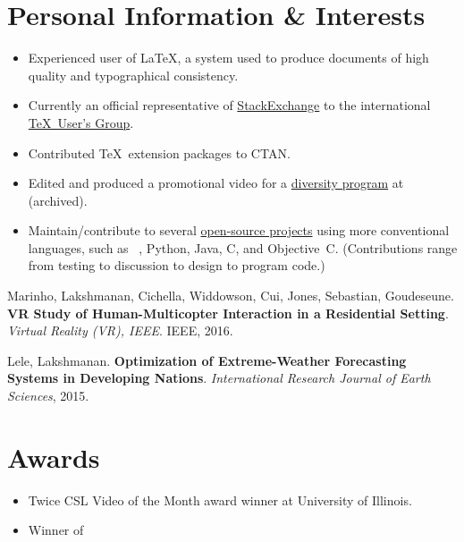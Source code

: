 \documentclass{simplecv}
\newif\ifinterests
\begin{document}
\vfill \vfill
\newpage

\section{Personal Information \& Interests}
\begin{itemize}
\item Experienced user of \LaTeX, a system used to produce documents
  of high quality and typographical consistency.
\item Currently an official representative of
  \href{http://meta.tex.stackexchange.com/a/4174/17423}{StackExchange}
  to the international \href{http://www.tug.org}{\TeX\ User's Group}.
\item Contributed \TeX\ extension packages to CTAN.
\item Edited and produced a promotional video for a \href{http://www.smcm.edu/desousabrent}{diversity program} at  (archived).
\item Maintain\slash contribute to several
  \href{http://www.github.com/vermiculus}{open-source projects}
  using more conventional languages, such as
  ~\Lisp, Python, Java, C, and Objective~C.
  (Contributions range from testing to discussion to design to program code.)
\end{itemize}

\renewcommand\refname{Publications}
\begin{thebibliography}{9}

    Marinho, Lakshmanan, Cichella, Widdowson, Cui, Jones, Sebastian, Goudeseune. 
    \textbf{VR Study of Human-Multicopter Interaction in a Residential Setting}. 
    \textit{Virtual Reality (VR), IEEE}. IEEE, 2016.

    Lele, Lakshmanan. 
    \textbf{Optimization of Extreme-Weather Forecasting Systems in Developing Nations}.
    \textit{International Research Journal of Earth Sciences}, 2015.
\end{thebibliography}
        
\section{Awards}
\begin{itemize}
    \item Twice CSL Video of the Month award winner at University of Illinois.
    \item Winner of 
\end{itemize}
\ifinterests
\vfill

\centering
Additional details on my projects and interests can be found at
\url{www.arunlakshmanan.com}.
\fi
\vfill
\end{document}
